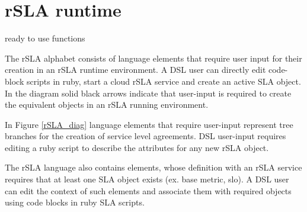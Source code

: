 \section{rSLA runtime}
\label{sec:runtime}
ready to use functions

The rSLA alphabet consists of language elements that require user input for their creation in an rSLA runtime environment. A DSL user can directly 
edit code-block scripts in ruby, start a cloud rSLA service and create an active SLA object. In the diagram solid black arrows indicate that 
user-input is required to create the equivalent objects in an rSLA running environment. 

In Figure \ref{rSLA_diag} language elements that require user-input represent tree branches for the creation of service level agreements. DSL 
user-input requires editing a ruby script to describe the attributes for any new rSLA object. 

The rSLA language also contains elements, whose definition with an rSLA service requires that at least one SLA object exists (ex. base metric, slo). A 
DSL user can edit the context of such elements and associate them with required objects using code blocks in ruby SLA scripts.
